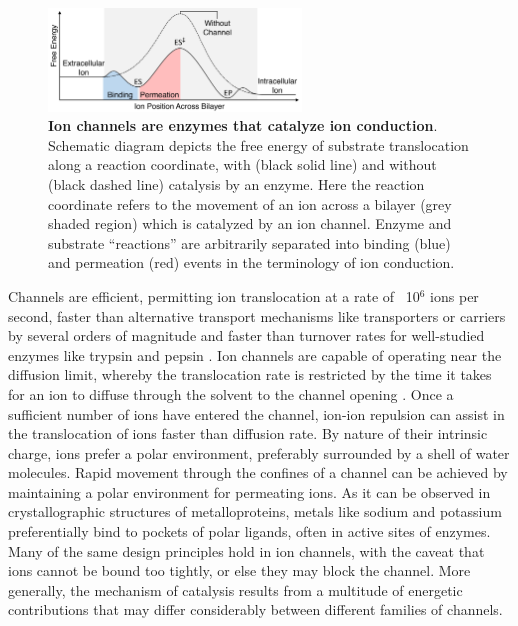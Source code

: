 \begin{refsection}
\begin{figure}[!htb]
\centering
\includegraphics[width=0.6\textwidth]{introduction/enzyme}
\caption[Ion channels are enzymes that catalyze ion conduction]{\textbf{Ion channels are enzymes that catalyze ion conduction}. Schematic diagram depicts the free energy of substrate translocation along a reaction coordinate, with (black solid line) and without (black dashed line) catalysis by an enzyme. Here the reaction coordinate refers to the movement of an ion across a bilayer (grey shaded region) which is catalyzed by an ion channel. Enzyme and substrate ``reactions'' are arbitrarily separated into binding (blue) and permeation (red) events in the terminology of ion conduction.}
\label{fig:enzyme}
\end{figure}

Channels are efficient, permitting ion translocation at a rate of ~10$^6$ ions per second, faster than alternative transport mechanisms like transporters or carriers by several orders of magnitude and faster than turnover rates for well-studied enzymes like trypsin and pepsin \cite{Andersen:1992tf}. Ion channels are capable of operating near the diffusion limit, whereby the translocation rate is restricted by the time it takes for an ion to diffuse through the solvent to the channel opening \cite{Andersen:1983bl}. Once a sufficient number of ions have entered the channel, ion-ion repulsion can assist in the translocation of ions faster than diffusion rate. By nature of their intrinsic charge, ions prefer a polar environment, preferably surrounded by a shell of water molecules. Rapid movement through the confines of a channel can be achieved by maintaining a polar environment for permeating ions. As it can be observed in crystallographic structures of metalloproteins, metals like sodium and potassium preferentially bind to pockets of polar ligands, often in active sites of enzymes. Many of the same design principles hold in ion channels, with the caveat that ions cannot be bound too tightly, or else they may block the channel. More generally, the mechanism of catalysis results from a multitude of energetic contributions that may differ considerably between different families of channels. 


\end{refsection}
